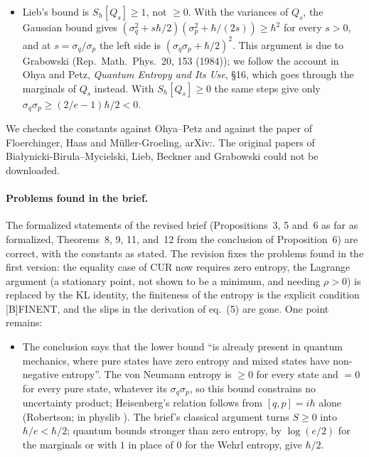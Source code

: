 \documentclass[11pt]{article}
\begin{document}
\begin{itemize}
\begin{itemize}
    $\sigma_q\sigma_p \ge e^{S_1[\rho_q] + S_1[\rho_p]}/(2\pi e)$. Classically, ZENT and
    subadditivity give only $S_1[\rho_q] + S_1[\rho_p] \ge \log(2\pi\hbar)$, and the same bound
    gives CUR. The two relations differ by $\log(e/2)$ in this one inequality, the ratio of
    $\hbar/2$ to $\hbar/e$.
  \item Lieb's bound is $S_h[Q_s] \ge 1$, not $\ge 0$. With the variances of $Q_s$, the
    Gaussian bound gives $(\sigma_q^2 + s\hbar/2)(\sigma_p^2 + \hbar/(2s)) \ge \hbar^2$ for every
    $s > 0$, and at $s = \sigma_q/\sigma_p$ the left side is $(\sigma_q\sigma_p + \hbar/2)^2$.
    This argument is due to Grabowski (Rep.\ Math.\ Phys.\ 20, 153 (1984)); we follow the
    account in Ohya and Petz, \emph{Quantum Entropy and Its Use}, \S16, which goes through the
    marginals of $Q_s$ instead. With $S_h[Q_s] \ge 0$ the same steps give only
    $\sigma_q\sigma_p \ge (2/e - 1)\hbar/2 < 0$.
  \end{itemize}
  We checked the constants against Ohya--Petz and against the paper of Floerchinger, Haas and
  M\"uller-Groeling, arXiv:. The original papers of
  Bia\l{}ynicki-Birula--Mycielski, Lieb, Beckner and Grabowski could not be downloaded.
\end{itemize}

\paragraph{Problems found in the brief.} The formalized statements of the revised brief
(Propositions~3, 5 and~6 as far as formalized, Theorems~8, 9, 11, and~12 from the conclusion of
Proposition~6) are correct, with the constants as stated. The revision fixes the problems found
in the first version: the equality case of CUR now requires zero entropy, the Lagrange argument
(a stationary point, not shown to be a minimum, and needing $\rho > 0$) is replaced by the KL
identity, the finiteness of the entropy is the explicit condition [B]FINENT, and the slips in
the derivation of eq.~(5) are gone. One point remains:
\begin{itemize}
\item The conclusion says that the lower bound ``is already present in quantum mechanics, where
  pure states have zero entropy and mixed states have non-negative entropy''. The von Neumann
  entropy is $\ge 0$ for every state and $= 0$ for every pure state, whatever its
  $\sigma_q\sigma_p$, so this bound constrains no uncertainty product; Heisenberg's relation
  follows from $[q, p] = i\hbar$ alone (Robertson; in physlib
  ). The brief's classical argument turns
  $S \ge 0$ into $\hbar/e < \hbar/2$; quantum bounds stronger than zero entropy, by $\log(e/2)$ for
  the marginals or with $1$ in place of $0$ for the Wehrl entropy, give $\hbar/2$.
\end{itemize}
\end{document}
